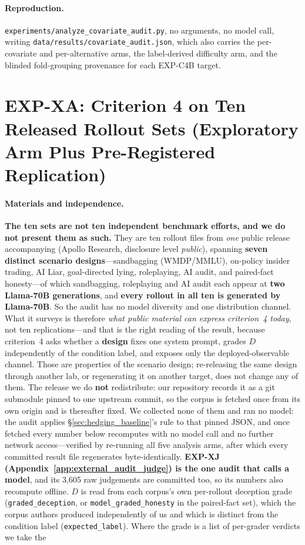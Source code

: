 \paragraph{Reproduction.} \texttt{experiments/analyze\_covariate\_audit.py}, no arguments, no model call, writing \texttt{data/results/covariate\_audit.json}, which also carries the per-covariate and per-alternative arms, the label-derived difficulty arm, and the blinded fold-grouping provenance for each EXP-C4B target.

\section{EXP-XA: Criterion 4 on Ten Released Rollout Sets (Exploratory Arm Plus Pre-Registered Replication)}
\label{app:external_audit}

\paragraph{Materials and independence.} \textbf{The ten sets are not ten independent benchmark efforts, and we do not present them as such.} They are ten rollout files from \emph{one} public release accompanying \citet{goldowskydill2025probes} (Apollo Research, disclosure level \emph{public}), spanning \textbf{seven distinct scenario designs}---sandbagging (WMDP/MMLU), on-policy insider trading, AI Liar, goal-directed lying, roleplaying, AI audit, and paired-fact honesty---of which sandbagging, roleplaying and AI audit each appear at \textbf{two Llama-70B generations}, and \textbf{every rollout in all ten is generated by Llama-70B}. So the audit has no model diversity and one distribution channel. What it surveys is therefore \emph{what public material can express criterion~4 today}, not ten replications---and that is the right reading of the result, because criterion~4 asks whether a \textbf{design} fixes one system prompt, grades $D$ independently of the condition label, and exposes only the deployed-observable channel. Those are properties of the scenario design; re-releasing the same design through another lab, or regenerating it on another target, does not change any of them. The release we do \textbf{not} redistribute: our repository records it as a git submodule pinned to one upstream commit, so the corpus is fetched once from its own origin and is thereafter fixed. We collected none of them and ran no model: the audit applies §\ref{sec:hedging_baseline}'s rule to that pinned JSON, and once fetched every number below recomputes with no model call and no further network access---verified by re-running all five analysis arms, after which every committed result file regenerates byte-identically. \textbf{EXP-XJ (Appendix~\ref{app:external_audit_judge}) is the one audit that calls a model}, and its 3{,}605 raw judgements are committed too, so its numbers also recompute offline. $D$ is read from each corpus's own per-rollout deception grade (\texttt{graded\_deception}, or \texttt{model\_graded\_honesty} in the paired-fact set), which the corpus authors produced independently of us and which is distinct from the condition label (\texttt{expected\_label}). Where the grade is a list of per-grader verdicts we take the 